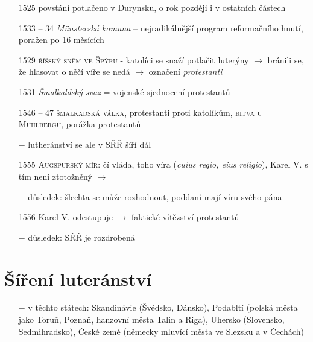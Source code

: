 \documentclass{article}
\begin{document}
\begin{itemize}
    \item[1525] povstání potlačeno v Durynsku, o rok později i v ostatních částech
    \item[1533 -- 34] \textit{Münsterská komuna} -- nejradikálnější program reformačního hnutí, poražen po 16 měsících
    \item[1529] \textsc{říšský sněm ve Špýru} - katolíci se snaží potlačit luterýny $\rightarrow$ bránili se, že hlasovat o něčí víře se nedá $\rightarrow$ označení \textit{protestanti}
    \item[1531] \textit{Šmalkaldský svaz} = vojenské sjednocení protestantů
    \item[1546 -- 47] \textsc{šmalkadská válka}, protestanti proti katolíkům, \textsc{bitva u Mühlbergu}, porážka protestantů
    \item[$-$] lutheránství se ale v SŘŘ šíří dál
    \item[1555] \textsc{Augspurský mír}: čí vláda, toho víra (\textit{cuius regio, eius religio}), Karel V. s tím není ztotožněný $\rightarrow$
    \item[$-$] důsledek: šlechta se může rozhodnout, poddaní mají víru svého pána
    \item[1556] Karel V. odestupuje $\rightarrow$ faktické vítězství protestantů
    \item[$-$] důsledek: SŘŘ je rozdrobená

\end{itemize}

\section*{Šíření luteránství}
\begin{itemize}
    \vspace{-0.5em}
    \setlength\itemsep{0.15em}
    \item[$-$] v těchto státech: Skandinávie (Švédsko, Dánsko), Podabltí (polská města jako Toruň, Poznaň, hanzovní města Talin a Riga), Uhersko (Slovensko, Sedmihradsko), České země (německy mluvící města ve Slezsku a v Čechách)
\end{itemize}
\end{document}
